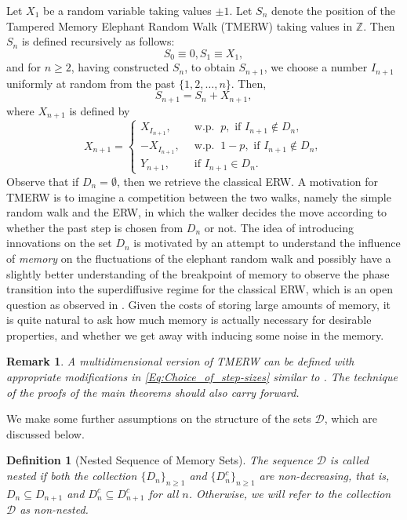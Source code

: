 \documentclass{article}
\numberwithin{equation}{section}
\newtheorem{remark}{Remark}
\newtheorem{defi}[theorem]{Definition}
\newcommand{\Z}{\mbox{${\mathbb Z}$}}
\newcommand{\1}{\mathbf{1}}
\newcommand{\0}{\mathbf{0}}
\begin{document}
 Let $X_1$ be a random variable taking values $\pm 1$. Let $S_n$ denote the position of the Tampered Memory Elephant Random Walk (TMERW) taking values in $\Z$. Then $S_n$ is defined recursively as follows:  
\[
S_0 \equiv 0, S_1 \equiv X_1, 
\]
and for $n \ge 2$, having constructed $S_n$, to obtain $S_{n+1}$, we choose a number $I_{n+1}$ uniformly at random from the past $\{1,2,\ldots, n\}$. Then, 
\begin{equation}
\label{Def: TERW}
S_{n+1}=S_n + X_{n+1},
\end{equation}
where $X_{n+1}$ is defined by 
\begin{equation}
\label{Eq:Choice_of_step-sizes}
X_{n+1}= \begin{cases}
           X_{I_{n+1}}, \, & \text{ w.p. } \ p, \text{ if } I_{n+1} \notin D_n, \\
           -X_{I_{n+1}}, \, & \text{ w.p. } \ 1-p, \text{ if } I_{n+1} \notin D_n, \\
           Y_{n+1}, \,  & \text{ if }  I_{n+1} \in D_n.
\end{cases}
\end{equation}
Observe that if $D_n = \emptyset$, then we retrieve the classical ERW. A motivation for TMERW is to imagine a competition between the two walks, namely the simple random walk and the ERW, in which the walker decides the move according to whether the past step is chosen from $D_n$ or not. The idea of introducing innovations on the set $D_n$ is motivated by an attempt to understand the influence of \textit{memory} on the fluctuations of the elephant random walk and possibly have a slightly better understanding of the breakpoint of memory to observe the phase transition into the superdiffusive regime for the classical ERW, which is an open question as observed in \cite{Gu_St_2021}. Given the costs of storing large amounts of memory, it is quite natural to ask how much memory is actually necessary for desirable properties, and whether we get away with inducing some noise in the memory. 
\begin{remark}
A multidimensional version of TMERW can be defined with appropriate modifications in \eqref{Eq:Choice_of_step-sizes} similar to \cite{Be_La_2019a}. The technique of the proofs of the main theorems should also carry forward.
\end{remark}
We make some further assumptions on the structure of the sets $\mathcal{D}$, which are discussed below.

\begin{defi}[Nested Sequence of Memory Sets]
\label{Def: nested_sets}
The sequence $\mathcal{D}$ is called nested if both the collection $\{D_n\}_{n \ge 1}$ and $\{D^c_n\}_{n \ge 1}$ are non-decreasing, that is, $D_n \subseteq D_{n+1}$ and $D^c_n \subseteq D^c_{n+1}$ for all $n$. Otherwise, we will refer to the collection $\mathcal{D}$ as non-nested.
\end{defi}
\end{document}
